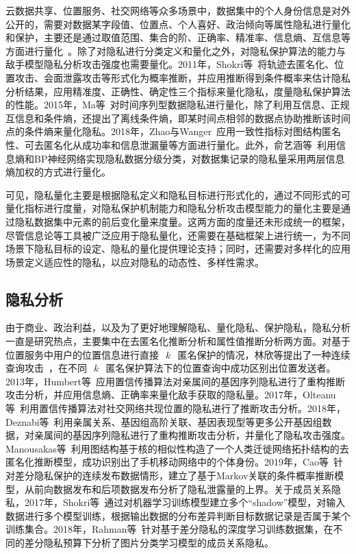 云数据共享、位置服务、社交网络等众多场景中，数据集中的个人身份信息是对外公开的，需要对数据某字段值、位置点、个人喜好、政治倾向等属性隐私进行量化和保护，主要还是通过取值范围、集合的阶、正确率、精准率、信息熵、互信息等方面进行量化~\cite{xiong2018research,wagner2018technical}。除了对隐私进行分类定义和量化之外，对隐私保护算法的能力与敌手模型隐私分析攻击强度也需要量化。2011年，Shokri等~\cite{shokri2011quantifying}将轨迹去匿名化、位置攻击、会面泄露攻击等形式化为概率推断，并应用推断得到条件概率来估计隐私分析结果，应用精准度、正确性、确定性三个指标来量化隐私，度量隐私保护算法的性能。2015年，Ma等~\cite{ma2015information}对时间序列型数据隐私进行量化，除了利用互信息、正规互信息和条件熵，还提出了离线条件熵，即某时间点相邻的数据点协助推断该时间点的条件熵来量化隐私。2018年，Zhao与Wanger~\cite{zhao2018evaluating}应用一致性指标对图结构匿名性、可去匿名化从成功率和信息泄漏量等方面进行量化。此外，俞艺涵等~\cite{yu2018shannon}利用信息熵和BP神经网络实现隐私数据分级分类，对数据集记录的隐私量采用两层信息熵加权的方式进行量化。

可见，隐私量化主要是根据隐私定义和隐私目标进行形式化的，通过不同形式的可量化指标进行度量，对隐私保护机制能力和隐私分析攻击模型能力的量化主要是通过隐私数据集中元素的前后变化量来度量。这两方面的度量还未形成统一的框架，尽管信息论等工具被广泛应用于隐私量化，还需要在基础框架上进行统一，为不同场景下隐私目标的设定、隐私的量化提供理论支持；同时，还需要对多样化的应用场景定义适应性的隐私，以应对隐私的动态性、多样性需求。

\subsection{隐私分析}
由于商业、政治利益，以及为了更好地理解隐私、量化隐私、保护隐私，隐私分析一直是研究热点，主要集中在去匿名化推断分析和属性值推断分析两方面。对基于位置服务中用户的位置信息进行直接~$~k~$~匿名保护的情况，林欣等提出了一种连续查询攻击~\cite{lin2009lbs}，在不同~$~k~$~匿名保护算法下的位置查询中成功区别出位置发送者。2013年，Humbert等~\cite{humbert2013addressing}应用置信传播算法对亲属间的基因序列隐私进行了重构推断攻击分析，并应用信息熵、正确率来量化敌手获取的隐私量。2017年，Olteanu等~\cite{olteanu2017quantifying}利用置信传播算法对社交网络共现位置的隐私进行了推断攻击分析。2018年，Deznabi等~\cite{deznabi2018inference}利用亲属关系、基因组高阶关联、基因表现型等更多公开基因组数据，对亲属间的基因序列隐私进行了重构推断攻击分析，并量化了隐私攻击强度。Manousakas等~\cite{manousakas2018quantifying}利用图结构基于核的相似性构造了一个人类迁徙网络拓扑结构的去匿名化推断模型，成功识别出了手机移动网络中的个体身份。2019年，Cao等~\cite{cao2019quantifying}针对差分隐私保护的连续发布数据情形，建立了基于Markov关联的条件概率推断模型，从前向数据发布和后项数据发布分析了隐私泄露量的上界。关于成员关系隐私，2017年，Shokri等~\cite{shokri2017membership}通过对机器学习训练模型建立多个“shadow”模型，对输入数据进行多个模型训练，根据输出数据的分布差异判断目标数据记录是否属于某个训练集合。2018年，Rahman等~\cite{rahman2018membership}针对基于差分隐私的深度学习训练数据集，在不同的差分隐私预算下分析了图片分类学习模型的成员关系隐私。

